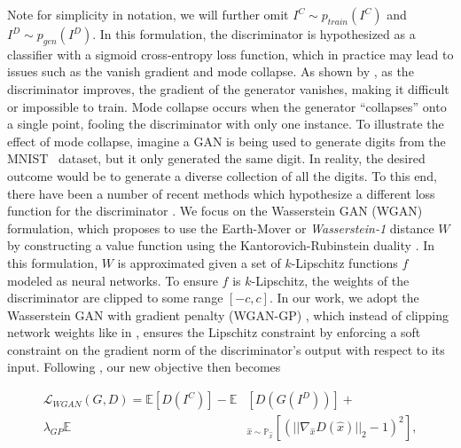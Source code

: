 Note for simplicity in notation, we will further omit $I^C \sim p_{train}(I^C)$ and $I^D \sim p_{gen}(I^D)$. In this formulation, 
the discriminator is hypothesized as a classifier with a sigmoid cross-entropy loss function, which in practice may lead
to issues  such as the vanish gradient and mode collapse. As shown by \cite{arjovsky2017towards}, as
the discriminator improves, the gradient of the generator vanishes, making it difficult or impossible to train. Mode
collapse occurs when the generator ``collapses'' onto a single point, fooling the discriminator with only one instance.
To illustrate the effect of mode collapse, imagine a GAN is being used to generate digits from the MNIST~\cite{lecun2010mnist} 
dataset, but it only generated the same digit. In reality, the desired outcome would be to generate a diverse collection of all 
the digits. To this end, there have been a number of recent methods which hypothesize a different loss function for the 
discriminator
\cite{mao2016least,arjovsky2017wasserstein,gulrajani2017improved,zhao2016energy}. We focus on the Wasserstein GAN
(WGAN) \cite{arjovsky2017wasserstein} formulation, which proposes to use the Earth-Mover or \textit{Wasserstein-1}
distance $W$ by constructing a value function using the Kantorovich-Rubinstein duality \cite{villani2008optimal}.
In this formulation, $W$ is approximated given a set of $k$-Lipschitz functions $f$ modeled as neural networks. To
ensure $f$ is $k$-Lipschitz, the weights of the discriminator are clipped to some range $[-c, c]$. In our work, we
adopt the Wasserstein GAN with gradient penalty (WGAN-GP) \cite{gulrajani2017improved}, which instead of clipping
network weights like in \cite{arjovsky2017wasserstein}, ensures the Lipschitz constraint by enforcing a soft
constraint on the gradient norm of the discriminator's output with respect to its input. Following
\cite{gulrajani2017improved}, our new objective then becomes

\begin{equation}
\begin{aligned}
   \mathcal{L}_{WGAN}(G,D) = \mathbb{E} [D(I^C)] - \mathbb{E} & [D(G(I^D))] + \\
   \lambda_{GP} \mathbb{E} & _{\hat{x} \sim \mathbb{P}_{\hat{x}}} [(|| \nabla_{\hat{x}} D(\hat{x})||_2 -1)^2 ],
\end{aligned}
\end{equation}


